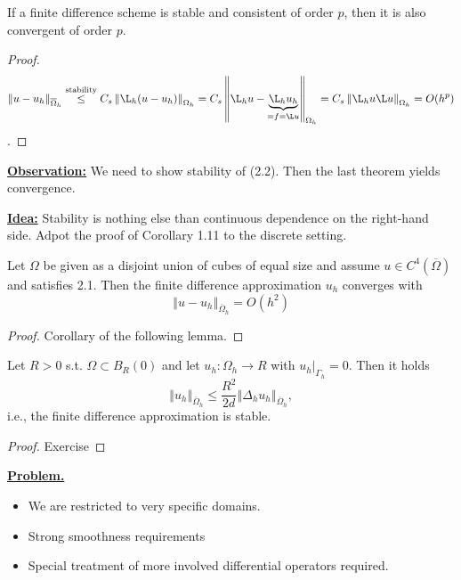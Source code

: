 \begin{theorem}
    If a finite difference scheme is stable and consistent of order $p$, then it is also convergent of order $p$. 
\end{theorem}

\begin{proof}

    \[\left\Vert u-u_h \right\Vert_{\overline{\Omega}_h}\stackrel{\text{stability}}{\leq} C_s \left\Vert \L_h(u-u_h) \right\Vert_{\Omega_h}=C_s \left\Vert \L_h u -\underbrace{\L_h u_h}_{=f=\L u} \right\Vert_{\Omega_h}=C_s \left\Vert \L_h u\L u\right\Vert_{\Omega_h}=O(h^p)\]. 

\end{proof}

\underline{\textbf{Observation:}} We need to show stability of (2.2). Then the last theorem yields convergence.

\underline{\textbf{Idea:}} Stability is nothing else than continuous dependence on the right-hand side. Adpot the proof of Corollary 1.11 to the discrete setting.

\begin{corollary}
    Let $\Omega$ be given as a disjoint union of cubes of equal size and assume $u\in C^4(\overline{\Omega})$ and satisfies 2.1. Then the finite difference approximation $u_h$ converges with 
    \[\left\Vert u-u_h \right\Vert_{\overline{\Omega}_h}=O(h^2)\]
\end{corollary}

\begin{proof}
    Corollary of the following lemma.
\end{proof}

\begin{lemma}
    Let $R>0$ s.t. $\Omega\subset B_R(0)$ and let $u_h:\Omega_h\to R$ with $u_h|_{\Gamma_h}=0$. Then it holds 
    \[\left\Vert u_h \right\Vert_{\overline{\Omega}_h}\leq \frac{R^2}{2d}\left\Vert \Delta_h u_h \right\Vert_{\overline{\Omega}_h},\]
    i.e., the finite difference approximation is stable.
\end{lemma}

\begin{proof}
    Exercise
\end{proof}

\underline{\textbf{Problem.}} 
\begin{itemize}
    \item We are restricted to very specific domains.
    \item Strong smoothness requirements 
    \item Special treatment of more involved differential operators required.
\end{itemize}


